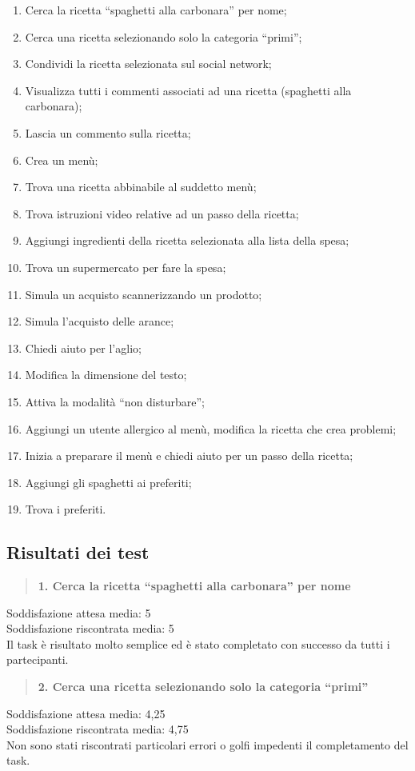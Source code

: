\begin{enumerate}
 \item Cerca la ricetta ``spaghetti alla carbonara'' per nome;
 \item Cerca una ricetta selezionando solo la categoria ``primi'';
 \item Condividi la ricetta selezionata sul social network;
 \item Visualizza tutti i commenti associati ad una ricetta (spaghetti alla
	 carbonara);
 \item Lascia un commento sulla ricetta;
 \item Crea un menù;
 \item Trova una ricetta abbinabile al suddetto menù;
 \item Trova istruzioni video relative ad un passo della ricetta;
 \item Aggiungi ingredienti della ricetta selezionata alla lista della spesa;
 \item Trova un supermercato per fare la spesa;
 \item Simula un acquisto scannerizzando un prodotto;
 \item Simula l'acquisto delle arance;
 \item Chiedi aiuto per l'aglio;
 \item Modifica la dimensione del testo;
 \item Attiva la modalità ``non disturbare'';
 \item Aggiungi un utente allergico al menù, modifica la ricetta che crea problemi;
 \item Inizia a preparare il menù e chiedi aiuto per un passo della ricetta;
 \item Aggiungi gli spaghetti ai preferiti;
 \item Trova i preferiti.
\end{enumerate}

\subsection{Risultati dei test}
\begin{quote}
	\textbf{1. Cerca la ricetta ``spaghetti alla carbonara'' per nome}
\end{quote}
Soddisfazione attesa media: 5\\
Soddisfazione riscontrata media: 5\\
Il task è risultato molto semplice ed è stato completato con successo da tutti
i partecipanti.

\begin{quote}
	\textbf{2. Cerca una ricetta selezionando solo la categoria ``primi''}
\end{quote}
Soddisfazione attesa media: 4,25\\
Soddisfazione riscontrata media: 4,75\\
Non sono stati riscontrati particolari errori o golfi impedenti il completamento
del task.

